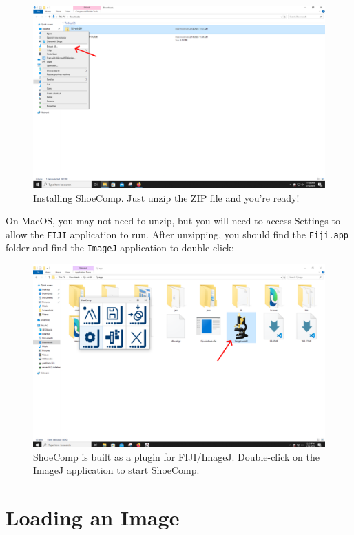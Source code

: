 \documentclass{csafedoc}
\begin{document}
\begin{figure}[H]
	\begin{center}
		\includegraphics[width=0.8\linewidth]{images/step_2-anno.png}
	\end{center}
	\caption{Installing ShoeComp. Just unzip the ZIP file and you're ready!}
	\label{fig:step2}
\end{figure}

On MacOS, you may not need to unzip, but you will need to access Settings to allow the
\texttt{FIJI} application to run. After unzipping, you should find the \texttt{Fiji.app}
folder and find the \texttt{ImageJ} application to double-click:

\begin{figure}[H]
	\begin{center}
		\includegraphics[width=0.8\linewidth]{images/step_3-anno.png}
	\end{center}
	\caption{ShoeComp is built as a plugin for FIJI/ImageJ. Double-click on the ImageJ application to start
		ShoeComp.}
	\label{fig:step3}
\end{figure}

\section{Loading an Image}
\end{document}

